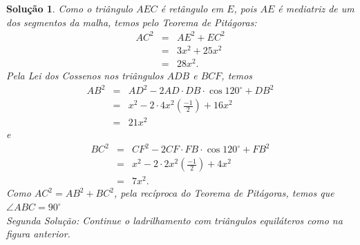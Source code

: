\documentclass{hipatia}
\newtheorem*{solution*}{Solução}
\begin{document}
\begin{solution*}
{\noindent Como o triângulo $AEC$ é retângulo em $E$, pois $AE$ é mediatriz de um dos segmentos da malha, temos pelo Teorema de Pitágoras:
\begin{eqnarray*}
 AC^2 & = & AE^2 + EC^2 \\
      & = & 3x^2+ 25x^2 \\
      & = & 28x^2.
\end{eqnarray*}
Pela Lei dos Cossenos nos triângulos $ADB$ e $BCF$, temos 
\begin{eqnarray*}
 AB^2 & = & AD^2-2AD \cdot DB \cdot \cos 120^{\circ} + DB^2 \\
      & = & x^{2}-2\cdot4x^{2}(\frac{-1}{2}) +16x^{2}\\
      & = & 21x^2
\end{eqnarray*}
e 
\begin{eqnarray*}
BC^2 & = & CF^2-2CF \cdot FB \cdot \cos 120^{\circ} + FB^2 \\
      & = & x^{2}-2\cdot2x^{2}(\frac{-1}{2})+4x^{2}\\
      & = & 7x^2.
\end{eqnarray*}
Como $AC^2=AB^2+BC^2$, pela recíproca do Teorema de Pitágoras, temos que $\angle ABC=90^{\circ}$}\\

\noindent Segunda Solução:
\noindent Continue o ladrilhamento com triângulos equiláteros como na figura anterior. 
\begin{center}



\begin{tikzpicture}[x=0.75pt,y=0.75pt,yscale=-0.7,xscale=0.7]


\end{tikzpicture}
\end{center}
\end{solution*}
\end{document}

